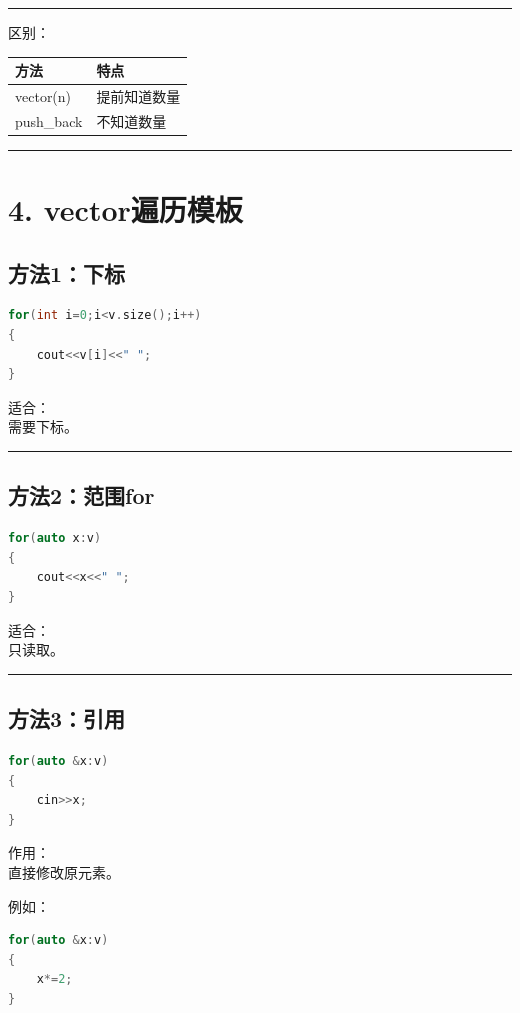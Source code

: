 \documentclass[10pt,twocolumn]{extarticle}
\begin{document}
\noindent\rule{\linewidth}{0.4pt}

区别：
\begin{table}[h]
\centering
\begin{tabular}{|l|l|}
\hline
方法 & 特点 \\ \hline
vector(n) & 提前知道数量 \\ \hline
push\_back & 不知道数量 \\ \hline
\end{tabular}
\end{table}

\noindent\rule{\linewidth}{0.4pt}

\section{4. vector遍历模板}

\subsection{方法1：下标}
\begin{lstlisting}[language=C++]
for(int i=0;i<v.size();i++)
{
    cout<<v[i]<<" ";
}
\end{lstlisting}
适合：\\
需要下标。

\noindent\rule{\linewidth}{0.4pt}

\subsection{方法2：范围for}
\begin{lstlisting}[language=C++]
for(auto x:v)
{
    cout<<x<<" ";
}
\end{lstlisting}
适合：\\
只读取。

\noindent\rule{\linewidth}{0.4pt}

\subsection{方法3：引用}
\begin{lstlisting}[language=C++]
for(auto &x:v)
{
    cin>>x;
}
\end{lstlisting}
作用：\\
直接修改原元素。

例如：
\begin{lstlisting}[language=C++]
for(auto &x:v)
{
    x*=2;
}
\end{lstlisting}
\end{document}
